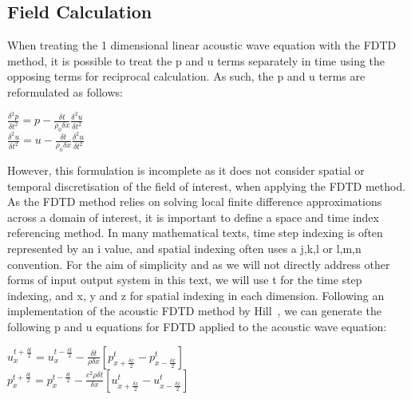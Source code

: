 \subsection{Field Calculation}
When treating the 1 dimensional linear acoustic wave equation with the FDTD method, it is possible to treat the p and u terms separately in time using the opposing terms for reciprocal calculation. As such, the p and u terms are reformulated as follows:\\
\begin{center}
$\frac{\delta^2 p}{\delta t^2} = p - \frac{\delta t}{\rho_0 \delta x} \frac{\delta^2 u}{\delta t^{2}}$\\
$\frac{\delta^2 u}{\delta t^2} = u - \frac{\delta t}{\rho_0 \delta x} \frac{\delta^2 u}{\delta t^{2}}$\\
\end{center}
However, this formulation is incomplete as it does not consider spatial or temporal discretisation of the field of interest, when applying the FDTD method. As the FDTD method relies on solving local finite difference approximations across a domain of interest, it is important to define a space and time index referencing method. In many mathematical texts, time step indexing is often represented by an i value, and spatial indexing often uses a j,k,l or l,m,n convention. For the aim of simplicity and as we will not directly address other forms of input output system in this text, we will use t for the time step indexing, and x, y and z for spatial indexing in each dimension.
Following an implementation of the acoustic FDTD method by Hill~\cite{Hill2012}, we can generate the following p and u equations for FDTD applied to the acoustic wave equation:\\
\begin{center}
$u^{t + \frac{\delta t}{2}}_{x} = u^{t - \frac{\delta t}{2}}_{x} - \frac{\delta t}{\rho \delta x} \left[p^{t}_{x + \frac{\delta x}{2}} - p^{t}_{x - \frac{\delta x}{2}}\right]$\\
$p^{t + \frac{\delta t}{2}}_{x} = p^{t - \frac{\delta t}{2}}_{x} - \frac{c^2 \rho \delta t}{\delta x} \left[u^{t}_{x + \frac{\delta x}{2}} - u^{t}_{x - \frac{\delta x}{2}}\right]$\\
\end{center}


